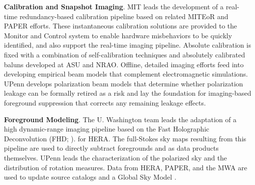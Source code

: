 \documentclass[ars]{copernicus}
\begin{document}
{\bf Calibration and Snapshot Imaging}. MIT leads
the development of a real-time redundancy-based calibration pipeline based on related
MITEoR and PAPER efforts.
These instantaneous calibration solutions are provided to
the Monitor and Control system to enable 
hardware misbehaviors to be quickly identified, and also support the
real-time imaging pipeline.  Absolute calibration is fixed with
a combination of self-calibration techniques and absolutely calibrated baluns developed at ASU and NRAO.
Offline, detailed imaging efforts feed into developing
empirical beam models that
complement electromagnetic simulations.  UPenn develops polarization beam models
that determine whether polarization leakage can be formally retired as 
a risk and lay the foundation for imaging-based foreground suppression that
corrects any remaining leakage effects.


{\bf Foreground Modeling}. The U. Washington team leads the adaptation
of a high dynamic-range imaging pipeline
based on the Fast Holographic Deconvolution (FHD; \citealt{sullivan_et_al2012}).
for HERA.  The full-Stokes sky maps resulting from this pipeline
are used to directly subtract foregrounds
and as data products themselves.  UPenn leads
the characterization of the polarized sky and the
distribution of rotation measures.  Data from HERA, PAPER, and the MWA are used
to update source catalogs and a Global
Sky Model \citep{deoliveira2008}. %


\end{document}
